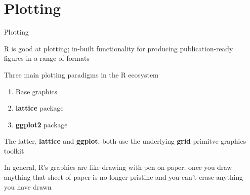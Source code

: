 \documentclass[10pt,ignorenonframetext,compress, aspectratio=169]{beamer}
\newenvironment{Shaded}{\begin{snugshade}}{\end{snugshade}}
\newcommand{\KeywordTok}[1]{\textcolor[rgb]{0.13,0.29,0.53}{\textbf{{#1}}}}
\newcommand{\StringTok}[1]{\textcolor[rgb]{0.31,0.60,0.02}{{#1}}}
\newcommand{\CommentTok}[1]{\textcolor[rgb]{0.56,0.35,0.01}{\textit{{#1}}}}
\newcommand{\NormalTok}[1]{{#1}}
\providecommand{\tightlist}{%
  \setlength{\itemsep}{0pt}\setlength{\parskip}{0pt}}
\newcommand{\columnsend}{\end{columns}}
\begin{document}

\section{Plotting}\label{plotting}

\begin{frame}{Plotting}

R is good at plotting; in-built functionality for producing
publication-ready figures in a range of formats

Three main plotting paradigms in the R ecosystem

\begin{enumerate}
\def\labelenumi{\arabic{enumi}.}
\tightlist
\item
  Base graphics
\item
  \textbf{lattice} package
\item
  \textbf{ggplot2} package
\end{enumerate}

The latter, \textbf{lattice} and \textbf{ggplot}, both use the
underlying \textbf{grid} primitve graphics toolkit

In general, R's graphics are like drawing with pen on paper; once you
draw anything that sheet of paper is no-longer pristine and you can't
erase anything you have drawn

\end{frame}
\end{document}
